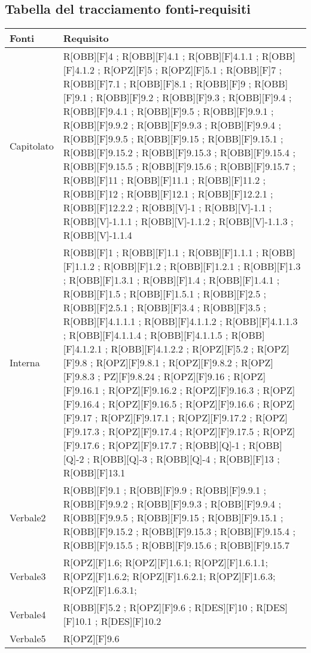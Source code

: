 \subsection{Tabella del tracciamento fonti-requisiti}
	\begin{table}[H]
		\centering
		\begin{tabular}{|p{}|p{}|}
			\toprule
			
			\textbf{Fonti} & \textbf{Requisito} \\
			
			\midrule

			Capitolato & R[OBB][F]4 ; R[OBB][F]4.1 ; R[OBB][F]4.1.1 ; R[OBB][F]4.1.2 ; R[OPZ][F]5 ; R[OPZ][F]5.1 ; R[OBB][F]7 ; R[OBB][F]7.1 ; R[OBB][F]8.1 ; R[OBB][F]9 ; R[OBB][F]9.1 ; R[OBB][F]9.2 ; R[OBB][F]9.3 ; R[OBB][F]9.4 ; R[OBB][F]9.4.1 ; R[OBB][F]9.5 ; R[OBB][F]9.9.1 ; R[OBB][F]9.9.2 ; R[OBB][F]9.9.3 ; R[OBB][F]9.9.4 ; R[OBB][F]9.9.5 ; R[OBB][F]9.15 ; R[OBB][F]9.15.1 ; R[OBB][F]9.15.2 ; R[OBB][F]9.15.3 ; R[OBB][F]9.15.4 ; R[OBB][F]9.15.5 ; R[OBB][F]9.15.6 ; R[OBB][F]9.15.7 ; R[OBB][F]11 ; R[OBB][F]11.1 ; R[OBB][F]11.2 ;  R[OBB][F]12 ; R[OBB][F]12.1 ; R[OBB][F]12.2.1 ; R[OBB][F]12.2.2 ; R[OBB][V]-1 ; R[OBB][V]-1.1 ; R[OBB][V]-1.1.1 ; R[OBB][V]-1.1.2 ; R[OBB][V]-1.1.3 ; R[OBB][V]-1.1.4 \\ \midrule

			Interna & R[OBB][F]1 ; R[OBB][F]1.1 ; R[OBB][F]1.1.1 ; R[OBB][F]1.1.2 ; R[OBB][F]1.2 ; R[OBB][F]1.2.1 ; R[OBB][F]1.3 ; R[OBB][F]1.3.1 ;  R[OBB][F]1.4 ; R[OBB][F]1.4.1 ; R[OBB][F]1.5 ; R[OBB][F]1.5.1 ; R[OBB][F]2.5 ; R[OBB][F]2.5.1 ; R[OBB][F]3.4 ; R[OBB][F]3.5 ; R[OBB][F]4.1.1.1 ; R[OBB][F]4.1.1.2 ; R[OBB][F]4.1.1.3 ; R[OBB][F]4.1.1.4 ; R[OBB][F]4.1.1.5 ; R[OBB][F]4.1.2.1 ; R[OBB][F]4.1.2.2 ; R[OPZ][F]5.2 ; R[OPZ][F]9.8 ; R[OPZ][F]9.8.1 ; R[OPZ][F]9.8.2 ; R[OPZ][F]9.8.3 ; PZ][F]9.8.24 ; R[OPZ][F]9.16 ; R[OPZ][F]9.16.1 ; R[OPZ][F]9.16.2 ; R[OPZ][F]9.16.3 ; R[OPZ][F]9.16.4 ; R[OPZ][F]9.16.5 ; R[OPZ][F]9.16.6 ; R[OPZ][F]9.17 ; R[OPZ][F]9.17.1 ; R[OPZ][F]9.17.2 ; R[OPZ][F]9.17.3 ; R[OPZ][F]9.17.4 ; R[OPZ][F]9.17.5 ; R[OPZ][F]9.17.6 ; R[OPZ][F]9.17.7 ; R[OBB][Q]-1 ; R[OBB][Q]-2 ; R[OBB][Q]-3 ; R[OBB][Q]-4 ; R[OBB][F]13 ; R[OBB][F]13.1\\ \midrule
			
			Verbale2 & R[OBB][F]9.1 ; R[OBB][F]9.9 ; R[OBB][F]9.9.1 ; R[OBB][F]9.9.2 ; R[OBB][F]9.9.3 ; R[OBB][F]9.9.4 ; R[OBB][F]9.9.5 ; R[OBB][F]9.15 ; R[OBB][F]9.15.1 ; R[OBB][F]9.15.2 ; R[OBB][F]9.15.3 ; R[OBB][F]9.15.4 ; R[OBB][F]9.15.5 ; R[OBB][F]9.15.6  ; R[OBB][F]9.15.7 \\ \midrule
			Verbale3 & R[OPZ][F]1.6; R[OPZ][F]1.6.1; R[OPZ][F]1.6.1.1; R[OPZ][F]1.6.2; R[OPZ][F]1.6.2.1; R[OPZ][F]1.6.3; R[OPZ][F]1.6.3.1; \\ \midrule
			Verbale4 & R[OBB][F]5.2 ; R[OPZ][F]9.6 ; R[DES][F]10 ; R[DES][F]10.1 ; R[DES][F]10.2 \\ \midrule
			Verbale5 & R[OPZ][F]9.6  \\ \midrule

		\end{tabular}
	\end{table}

